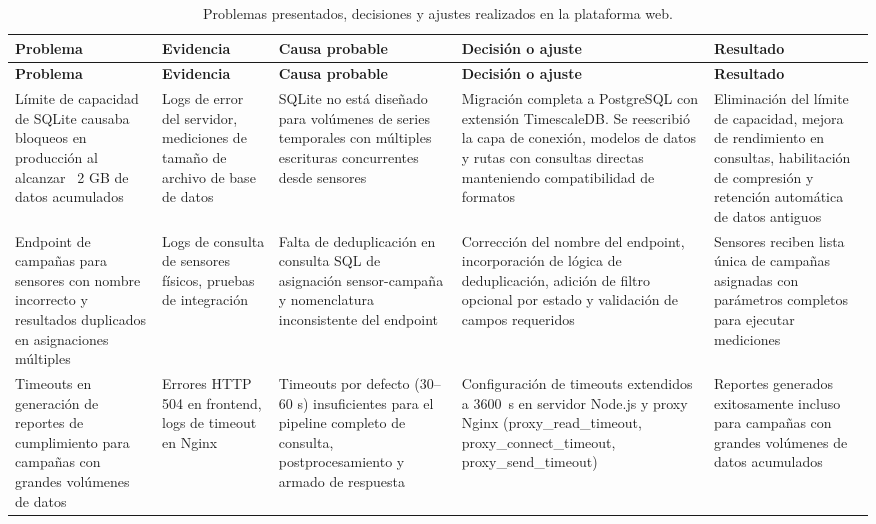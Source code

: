\begin{longtable}{p{2.7cm} p{2.7cm} p{2.7cm} p{3cm} p{3cm}}
\caption{Problemas presentados, decisiones y ajustes realizados en la
plataforma web.}\\
\toprule
\textbf{Problema} & \textbf{Evidencia} & \textbf{Causa probable} &
\textbf{Decisión o ajuste} & \textbf{Resultado} \\
\midrule
\endfirsthead
\toprule
\textbf{Problema} & \textbf{Evidencia} & \textbf{Causa probable} &
\textbf{Decisión o ajuste} & \textbf{Resultado} \\
\midrule
\endhead

Límite de capacidad de SQLite causaba bloqueos en producción al alcanzar
~2 GB de datos acumulados &
Logs de error del servidor, mediciones de tamaño de archivo de base de datos &
SQLite no está diseñado para volúmenes de series temporales con múltiples
escrituras concurrentes desde sensores &
Migración completa a PostgreSQL con extensión TimescaleDB. Se reescribió la
capa de conexión, modelos de datos y rutas con consultas directas manteniendo
compatibilidad de formatos &
Eliminación del límite de capacidad, mejora de rendimiento en consultas,
habilitación de compresión y retención automática de datos antiguos \\

\addlinespace

Endpoint de campañas para sensores con nombre incorrecto y resultados
duplicados en asignaciones múltiples &
Logs de consulta de sensores físicos, pruebas de integración &
Falta de deduplicación en consulta SQL de asignación sensor-campaña y
nomenclatura inconsistente del endpoint &
Corrección del nombre del endpoint, incorporación de lógica de deduplicación,
adición de filtro opcional por estado y validación de campos requeridos &
Sensores reciben lista única de campañas asignadas con parámetros completos
para ejecutar mediciones \\

\addlinespace

Timeouts en generación de reportes de cumplimiento para campañas con grandes
volúmenes de datos &
Errores HTTP 504 en frontend, logs de timeout en Nginx &
Timeouts por defecto (30--60 s) insuficientes para el pipeline completo de
consulta, postprocesamiento y armado de respuesta &
Configuración de timeouts extendidos a 3600~s en servidor Node.js y proxy
Nginx (proxy\_read\_timeout, proxy\_connect\_timeout, proxy\_send\_timeout) &
Reportes generados exitosamente incluso para campañas con grandes volúmenes
de datos acumulados \\


\end{longtable}

